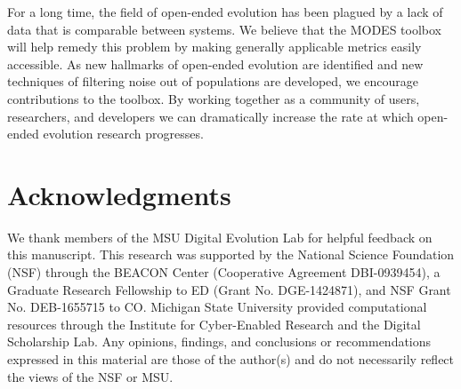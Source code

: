 \documentclass[letterpaper]{article}
\begin{document}


For a long time, the field of open-ended evolution has been plagued by a lack of data that is comparable between systems. We believe that the MODES toolbox will help remedy this problem by making generally applicable metrics easily accessible. As new hallmarks of open-ended evolution are identified and new techniques of filtering noise out of populations are developed, we encourage contributions to the toolbox. By working together as a community of users, researchers, and developers we can dramatically increase the rate at which open-ended evolution research progresses.


\section{Acknowledgments}
We thank members of the MSU Digital Evolution Lab for helpful feedback on this manuscript. This research was supported by the National Science Foundation (NSF) through the BEACON Center (Cooperative Agreement DBI-0939454), a Graduate Research Fellowship to ED (Grant No. DGE-1424871), and NSF Grant No. DEB-1655715 to CO. Michigan State University provided computational resources through the Institute for Cyber-Enabled Research and the Digital Scholarship Lab. Any opinions, findings, and conclusions or recommendations expressed in this material are those of the author(s) and do not necessarily reflect the views of the NSF or MSU.



\end{document}
